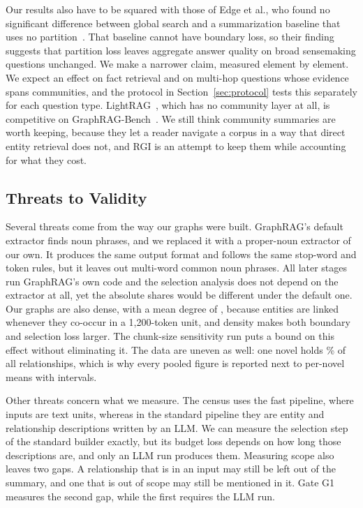 \documentclass{ieeeaccess}
\theoremstyle{remark}
\begin{document}
Our results also have to be squared with those of Edge et al., who found no significant difference between global search and a summarization baseline that uses no partition~\cite{edge2024graphrag}. That baseline cannot have boundary loss, so their finding suggests that partition loss leaves aggregate answer quality on broad sensemaking questions unchanged. We make a narrower claim, measured element by element. We expect an effect on fact retrieval and on multi-hop questions whose evidence spans communities, and the protocol in Section~\ref{sec:protocol} tests this separately for each question type. LightRAG~\cite{guo2024lightrag}, which has no community layer at all, is competitive on GraphRAG-Bench~\cite{xiang2026graphragbench}. We still think community summaries are worth keeping, because they let a reader navigate a corpus in a way that direct entity retrieval does not, and RGI is an attempt to keep them while accounting for what they cost.

\subsection{Threats to Validity}\label{sec:threats}

Several threats come from the way our graphs were built. GraphRAG's default extractor finds noun phrases, and we replaced it with a proper-noun extractor of our own. It produces the same output format and follows the same stop-word and token rules, but it leaves out multi-word common noun phrases. All later stages run GraphRAG's own code and the selection analysis does not depend on the extractor at all, yet the absolute shares would be different under the default one. Our graphs are also dense, with a mean degree of \MeanDegree, because entities are linked whenever they co-occur in a 1,200-token unit, and density makes both boundary and selection loss larger. The chunk-size sensitivity run puts a bound on this effect without eliminating it. The data are uneven as well: one novel holds \BigNovelShare\% of all relationships, which is why every pooled figure is reported next to per-novel means with intervals.

Other threats concern what we measure. The census uses the fast pipeline, where inputs are text units, whereas in the standard pipeline they are entity and relationship descriptions written by an LLM. We can measure the selection step of the standard builder exactly, but its budget loss depends on how long those descriptions are, and only an LLM run produces them. Measuring scope also leaves two gaps. A relationship that is in an input may still be left out of the summary, and one that is out of scope may still be mentioned in it. Gate G1 measures the second gap, while the first requires the LLM run.
\end{document}
